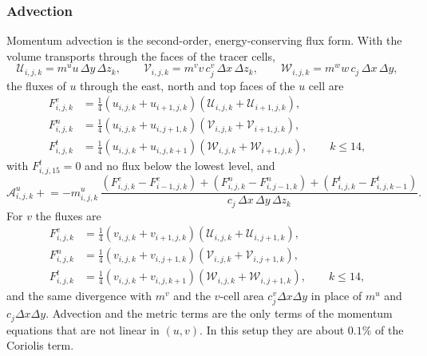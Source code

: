 \documentclass{article}
\begin{document}
\subsubsection*{Advection}
Momentum advection is the second-order, energy-conserving flux form. With the volume transports through the faces of the tracer cells,
\[
\mathcal{U}_{i,j,k} = m^u u\,\Delta y\,\Delta z_k, \qquad
\mathcal{V}_{i,j,k} = m^v v\,c^v_j\,\Delta x\,\Delta z_k, \qquad
\mathcal{W}_{i,j,k} = m^w w\,c_j\,\Delta x\,\Delta y,
\]
the fluxes of $u$ through the east, north and top faces of the $u$ cell are
\begin{align*}
F^e_{i,j,k} &= \tfrac14 (u_{i,j,k} + u_{i+1,j,k})(\mathcal{U}_{i,j,k} + \mathcal{U}_{i+1,j,k}), \\
F^n_{i,j,k} &= \tfrac14 (u_{i,j,k} + u_{i,j+1,k})(\mathcal{V}_{i,j,k} + \mathcal{V}_{i+1,j,k}), \\
F^t_{i,j,k} &= \tfrac14 (u_{i,j,k} + u_{i,j,k+1})(\mathcal{W}_{i,j,k} + \mathcal{W}_{i+1,j,k}), \qquad k \le 14,
\end{align*}
with $F^t_{i,j,15} = 0$ and no flux below the lowest level, and
\[
\mathcal{A}^u_{i,j,k} \mathrel{+}= -m^u_{i,j,k}\,\frac{(F^e_{i,j,k} - F^e_{i-1,j,k}) + (F^n_{i,j,k} - F^n_{i,j-1,k}) + (F^t_{i,j,k} - F^t_{i,j,k-1})}{c_j\,\Delta x\,\Delta y\,\Delta z_k}.
\]
For $v$ the fluxes are
\begin{align*}
F^e_{i,j,k} &= \tfrac14 (v_{i,j,k} + v_{i+1,j,k})(\mathcal{U}_{i,j,k} + \mathcal{U}_{i,j+1,k}), \\
F^n_{i,j,k} &= \tfrac14 (v_{i,j,k} + v_{i,j+1,k})(\mathcal{V}_{i,j,k} + \mathcal{V}_{i,j+1,k}), \\
F^t_{i,j,k} &= \tfrac14 (v_{i,j,k} + v_{i,j,k+1})(\mathcal{W}_{i,j,k} + \mathcal{W}_{i,j+1,k}), \qquad k \le 14,
\end{align*}
and the same divergence with $m^v$ and the $v$-cell area $c^v_j\Delta x\Delta y$ in place of $m^u$ and $c_j\Delta x\Delta y$.
Advection and the metric terms are the only terms of the momentum equations that are not linear in $(u,v)$. In this setup they are about $0.1\%$ of the Coriolis term.
\end{document}
